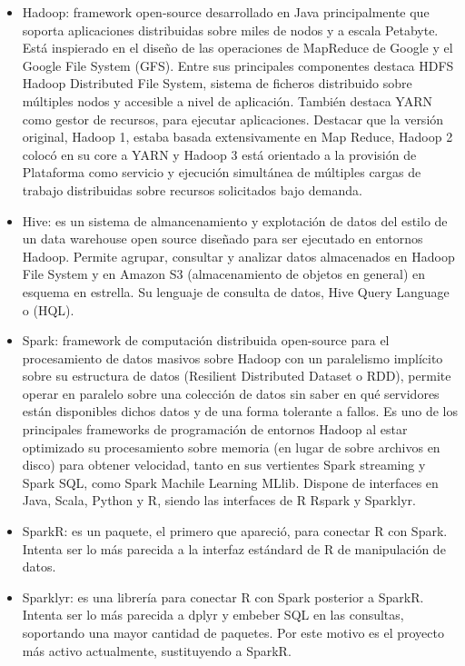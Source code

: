 \documentclass[]{book}
\begin{document}
\begin{itemize}
\item
  Hadoop: framework open-source desarrollado en Java principalmente que soporta aplicaciones distribuidas sobre miles de nodos y a escala Petabyte. Está inspierado en el diseño de las operaciones de MapReduce de Google y el Google File System (GFS). Entre sus principales componentes destaca HDFS Hadoop Distributed File System, sistema de ficheros distribuido sobre múltiples nodos y accesible a nivel de aplicación. También destaca YARN como gestor de recursos, para ejecutar aplicaciones. Destacar que la versión original, Hadoop 1, estaba basada extensivamente en Map Reduce, Hadoop 2 colocó en su core a YARN y Hadoop 3 está orientado a la provisión de Plataforma como servicio y ejecución simultánea de múltiples cargas de trabajo distribuidas sobre recursos solicitados bajo demanda.
\item
  Hive: es un sistema de almancenamiento y explotación de datos del estilo de un data warehouse open source diseñado para ser ejecutado en entornos Hadoop. Permite agrupar, consultar y analizar datos almacenados en Hadoop File System y en Amazon S3 (almacenamiento de objetos en general) en esquema en estrella. Su lenguaje de consulta de datos, Hive Query Language o (HQL).
\item
  Spark: framework de computación distribuida open-source para el procesamiento de datos masivos sobre Hadoop con un paralelismo implícito sobre su estructura de datos (Resilient Distributed Dataset o RDD), permite operar en paralelo sobre una colección de datos sin saber en qué servidores están disponibles dichos datos y de una forma tolerante a fallos. Es uno de los principales frameworks de programación de entornos Hadoop al estar optimizado su procesamiento sobre memoria (en lugar de sobre archivos en disco) para obtener velocidad, tanto en sus vertientes Spark streaming y Spark SQL, como Spark Machile Learning MLlib. Dispone de interfaces en Java, Scala, Python y R, siendo las interfaces de R Rspark y Sparklyr.
\item
  SparkR: es un paquete, el primero que apareció, para conectar R con Spark. Intenta ser lo más parecida a la interfaz estándard de R de manipulación de datos.
\item
  Sparklyr: es una librería para conectar R con Spark posterior a SparkR. Intenta ser lo más parecida a dplyr y embeber SQL en las consultas, soportando una mayor cantidad de paquetes. Por este motivo es el proyecto más activo actualmente, sustituyendo a SparkR.
\end{itemize}
\end{document}
